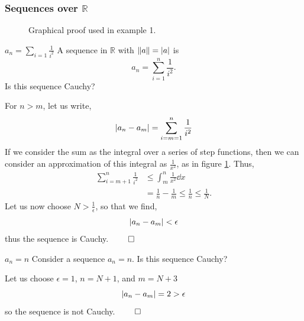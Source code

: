 \documentclass{book}
\begin{document}
\subsubsection{Sequences over $\mathbb{R}$}
	\begin{figure}
		\centering
	\caption{Graphical proof used in example 1.}
	\label{fig:proof1}
\end{figure}
\begin{Examples}{$a_n = \sum_{i=1} \frac{1}{i^2}$}{}
	A sequence in $\mathbb{R}$ with $\norm{a} = \abs{a}$ is
	\begin{equation}
		a_n =  \sum_{i=1}^{n}\frac{1}{i^2}.
	\end{equation}
	Is this sequence Cauchy?
\end{Examples}
	For $n > m$, let us write,
	\begin{equation}
		\abs{a_n - a_m} = \sum_{i=m=1}^{n} \frac{1}{i^2}
	\end{equation}
	If we consider the sum as the integral over a series of step functions, then we can consider an approximation of this integral as $\frac{1}{x^2}$, as in figure \ref{fig:proof1}. Thus,
	\begin{equation}
		\begin{split}
			\sum_{i = m+1}^{n}\frac{1}{i^2} & \leq \int_m^n \frac{1}{x^2}\dd{x} \\
			& = \frac{1}{n} - \frac{1}{m} \leq \frac{1}{n} \leq \frac{1}{N}.
		\end{split}
	\end{equation}
	Let us now choose $N > \frac{1}{\epsilon}$, so that we find,
	\begin{equation}
		\abs{a_n - a_m} < \epsilon
	\end{equation}
	thus the sequence is Cauchy. $\qed$
\begin{Examples}{$a_n = n$}
	Consider a sequence $a_n = n$. Is this sequence Cauchy?
\end{Examples}
Let us choose $\epsilon = 1$, $n = N+1$, and $m = N + 3$
	\begin{equation}
		\abs{a_n - a_m} = 2 > \epsilon
	\end{equation}
	so the sequence is not Cauchy. $\qed$
\end{document}
